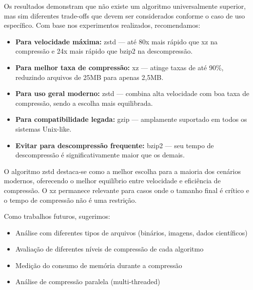 \documentclass[acmsmall]{acmart}
\begin{document}
Os resultados demonstram que não existe um algoritmo universalmente superior, mas sim diferentes trade-offs que devem ser considerados conforme o caso de uso específico. Com base nos experimentos realizados, recomendamos:

\begin{itemize}
  \item \textbf{Para velocidade máxima:} zstd --- até 80x mais rápido que xz na compressão e 24x mais rápido que bzip2 na descompressão.
  \item \textbf{Para melhor taxa de compressão:} xz --- atinge taxas de até 90\%, reduzindo arquivos de 25MB para apenas 2,5MB.
  \item \textbf{Para uso geral moderno:} zstd --- combina alta velocidade com boa taxa de compressão, sendo a escolha mais equilibrada.
  \item \textbf{Para compatibilidade legada:} gzip --- amplamente suportado em todos os sistemas Unix-like.
  \item \textbf{Evitar para descompressão frequente:} bzip2 --- seu tempo de descompressão é significativamente maior que os demais.
\end{itemize}

O algoritmo zstd destaca-se como a melhor escolha para a maioria dos cenários modernos, oferecendo o melhor equilíbrio entre velocidade e eficiência de compressão. O xz permanece relevante para casos onde o tamanho final é crítico e o tempo de compressão não é uma restrição.

Como trabalhos futuros, sugerimos:
\begin{itemize}
  \item Análise com diferentes tipos de arquivos (binários, imagens, dados científicos)
  \item Avaliação de diferentes níveis de compressão de cada algoritmo
  \item Medição do consumo de memória durante a compressão
  \item Análise de compressão paralela (multi-threaded)
\end{itemize}



\end{document}
